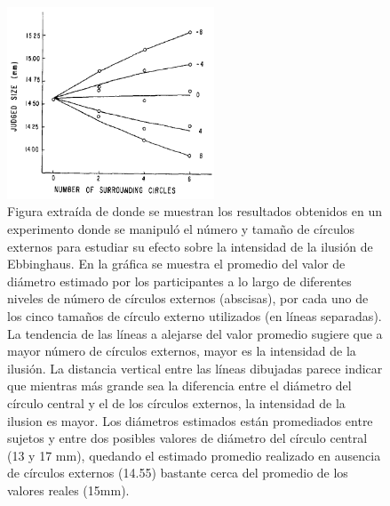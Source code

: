 \begin{figure}[th]
\centering
\includegraphics[width=0.55\textwidth]{Figures/Ebb_Variables} 
\decoRule
\caption[Efecto del Numero y Tamaño de los círculos externos sobre la intensidad de la Ilusión de Ebbinghaus]{Figura extraída de \parencite{Massaro1971} donde se muestran los resultados obtenidos en un experimento donde se manipuló el número y tamaño de círculos externos para estudiar su efecto sobre la intensidad de la ilusión de Ebbinghaus. En la gráfica se muestra el promedio del valor de diámetro estimado por los participantes a lo largo de diferentes niveles de número de círculos externos (abscisas), por cada uno de los cinco tamaños de círculo externo utilizados (en líneas separadas). La tendencia de las líneas a alejarse del valor promedio sugiere que a mayor número de círculos externos, mayor es la intensidad de la ilusión. La distancia vertical entre las líneas dibujadas parece indicar que mientras más grande sea la diferencia entre el diámetro del círculo central y el de los círculos externos, la intensidad de la ilusion es mayor. Los diámetros estimados están promediados entre sujetos y entre dos posibles valores de diámetro del círculo central (13 y 17 mm), quedando el estimado promedio realizado en ausencia de círculos externos (14.55) bastante cerca del promedio de los valores reales (15mm).}
\label{fig:Ebb_Var}
\end{figure}


